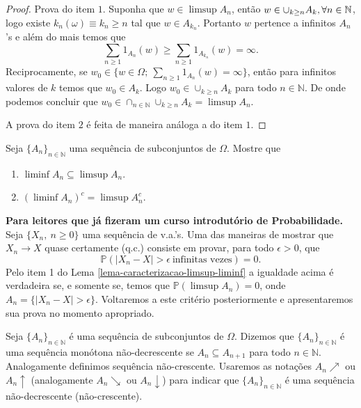 \begin{proof}
Prova do item $1$. Suponha que $w \in \limsup A_n$, então 
$w \in \cup_{k \geq n} A_k,
\forall n \in \mathbb{N}$, logo existe 
$k_n(\omega)\equiv k_n \geqslant n$ tal que $w \in A_{k_n}$. 
Portanto $w$ pertence a infinitos $A_n$'s e além do mais temos 
que 
%
	\[
		\sum \limits_{n \geqslant 1} 1_{A_n}(w) 
		\geqslant 
		\sum \limits_{n\geqslant 1} 1_{A_{k_n}}(w) 
		= 
		\infty.
	\]
%
Reciprocamente, 
se 
$ w_0 \in \{ w \in \Omega;\ \sum_{n \geqslant 1} 1_{A_n}(w)= \infty \}$, 
então para infinitos valores de $k$ temos que $w_0 \in A_k$. 
Logo  $w_0 \in \cup_{k\geq n} A_k$ para todo $n\in\mathbb{N}$.
De onde podemos concluir que 
$w_0 \in \cap_{n\in\mathbb{N}}\cup_{k\geq n} A_k=\limsup A_n$.

A prova do item $2$ é feita de maneira análoga a do item $1$. 
\end{proof}



\begin{exercicio}\label{exercicio-continencia-liminf-limsup} 
Seja $\{A_n\}_{n\in\mathbb{N}}$ uma sequência de subconjuntos de $\Omega$.
Mostre que 
%
\begin{enumerate}
\item $\liminf A_n \subseteq \limsup A_n$.
\item $\left( \liminf A_n \right)^c = \limsup A_n^c$. 
\end{enumerate}
\end{exercicio}







\begin{observacao} 
{\bf Para leitores que já fizeram um curso introdutório 
de Probabilidade.}
Seja $\{X_n,\ n\geqslant 0\}$ uma sequência de v.a.'s.
Uma das maneiras de mostrar que $X_n \to X$ quase certamente
(q.c.) consiste em provar, para todo $\epsilon>0$, que 
\[
	\mathbb{P}( |X_n-X| > \epsilon \ \text{infinitas vezes} )=0.
\] 
Pelo item 1 do Lema \ref{lema-caracterizacao-limsup-liminf} 
a igualdade acima é verdadeira se, e somente se, temos que
$\mathbb{P} (\limsup A_n )=0$, onde
$A_n=\{|X_n-X|>\epsilon\}$.
Voltaremos a este critério posteriormente e apresentaremos
sua prova no momento apropriado.
\end{observacao}







\begin{definicao}
Seja $\{A_n\}_{n\in\mathbb{N}}$ é uma sequência de 
subconjuntos de $\Omega$. 
Dizemos que $\{A_n\}_{n\in\mathbb{N}}$ é uma sequência 
monótona não-decrescente 
se $A_n \subseteq A_{n+1}$ para todo $n\in\mathbb{N}$.
Analogamente definimos sequência não-crescente.
Usaremos as notações $A_n \nearrow$ ou $A_n \uparrow$ 
(analogamente $A_n\searrow$ ou $A_n \downarrow$)
para indicar que $\{A_n\}_{n\in\mathbb{N}}$ é uma sequência 
não-decrescente (não-crescente).
\end{definicao}







